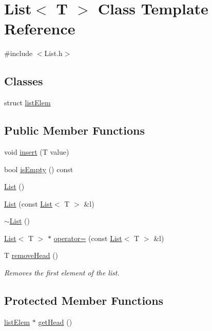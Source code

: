 \hypertarget{class_list}{}\section{List$<$ T $>$ Class Template Reference}
\label{class_list}


{\ttfamily \#include $<$List.\+h$>$}

\subsection*{Classes}
\begin{DoxyCompactItemize}
\item 
struct \hyperlink{struct_list_1_1list_elem}{list\+Elem}
\end{DoxyCompactItemize}
\subsection*{Public Member Functions}
\begin{DoxyCompactItemize}
\item 
void \hyperlink{class_list_afea509b891b4541319974ea062e56d14}{insert} (T value)
\item 
bool \hyperlink{class_list_a6ae0df0d666cd7df1873106cdad93e2a}{is\+Empty} () const
\item 
\hyperlink{class_list_a5c5e27671b21b3815d4e25b953c69454}{List} ()
\item 
\hyperlink{class_list_a5ccfa2e417b814e6217a16696e4eab5d}{List} (const \hyperlink{class_list}{List}$<$ T $>$ \&l)
\item 
\hyperlink{class_list_a2b58189090f6e5ce52939c9195e59e85}{$\sim$\+List} ()
\item 
\hyperlink{class_list}{List}$<$ T $>$ $\ast$ \hyperlink{class_list_a93c7a3166ef42cc92e3df4c03cc92b2f}{operator=} (const \hyperlink{class_list}{List}$<$ T $>$ \&l)
\item 
T \hyperlink{class_list_abf3f18858335e6cebb451c80d22edf6f}{remove\+Head} ()
\begin{DoxyCompactList}\small\item\em Removes the first element of the list. \end{DoxyCompactList}\end{DoxyCompactItemize}
\subsection*{Protected Member Functions}
\begin{DoxyCompactItemize}
\item 
\hyperlink{struct_list_1_1list_elem}{list\+Elem} $\ast$ \hyperlink{class_list_a920e07d6f0047af1404e251a58adb4c2}{get\+Head} ()
\end{DoxyCompactItemize}
